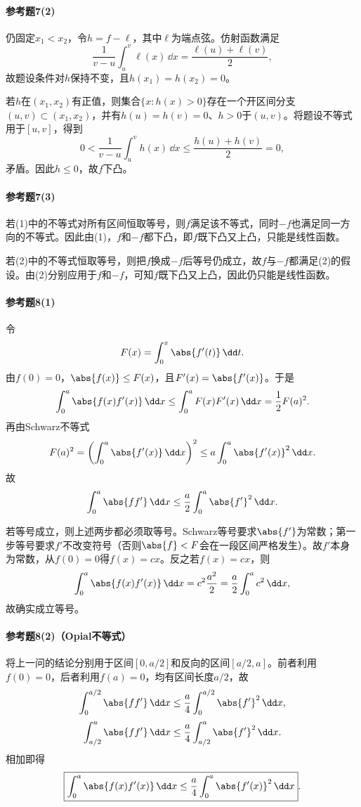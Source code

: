 \paragraph{参考题7(2)}
\begin{xsolution}
仍固定$x_1<x_2$，令$h=f-\ell$，其中$\ell$为端点弦。仿射函数满足
\[
 \frac1{v-u}\int_u^v\ell(x)\,\dd x=\frac{\ell(u)+\ell(v)}2,
\]
故题设条件对$h$保持不变，且$h(x_1)=h(x_2)=0$。

若$h$在$(x_1,x_2)$有正值，则集合$\{x:h(x)>0\}$存在一个开区间分支$(u,v)\subset(x_1,x_2)$，并有$h(u)=h(v)=0$、$h>0$于$(u,v)$。将题设不等式用于$[u,v]$，得到
\[
 0<\frac1{v-u}\int_u^vh(x)\,\dd x
 \le\frac{h(u)+h(v)}2=0,
\]
矛盾。因此$h\le0$，故$f$下凸。
\end{xsolution}

\paragraph{参考题7(3)}
\begin{xsolution}
若(1)中的不等式对所有区间恒取等号，则$f$满足该不等式，同时$-f$也满足同一方向的不等式。因此由(1)，$f$和$-f$都下凸，即$f$既下凸又上凸，只能是线性函数。

若(2)中的不等式恒取等号，则把$f$换成$-f$后等号仍成立，故$f$与$-f$都满足(2)的假设。由(2)分别应用于$f$和$-f$，可知$f$既下凸又上凸，因此仍只能是线性函数。
\end{xsolution}

\paragraph{参考题8(1)}
\begin{xsolution}
令
\[
 F(x)=\int_0^x\abs{f'(t)}\,\dd t.
\]
由$f(0)=0$，$\abs{f(x)}\le F(x)$，且$F'(x)=\abs{f'(x)}$。于是
\[
 \int_0^a\abs{f(x)f'(x)}\,\dd x
 \le\int_0^aF(x)F'(x)\,\dd x
 =\frac12F(a)^2.
\]
再由Schwarz不等式
\[
 F(a)^2=\left(\int_0^a\abs{f'(x)}\,\dd x\right)^2
 \le a\int_0^a\abs{f'(x)}^2\,\dd x.
\]
故
\[
 \int_0^a\abs{ff'}\,\dd x
 \le\frac a2\int_0^a\abs{f'}^2\,\dd x.
\]

若等号成立，则上述两步都必须取等号。Schwarz等号要求$\abs{f'}$为常数；第一步等号要求$f'$不改变符号（否则$\abs{f}<F$会在一段区间严格发生）。故$f'$本身为常数，从$f(0)=0$得$f(x)=cx$。反之若$f(x)=cx$，则
\[
 \int_0^a\abs{f(x)f'(x)}\,\dd x
 =c^2\frac{a^2}{2}
 =\frac a2\int_0^ac^2\,\dd x,
\]
故确实成立等号。
\end{xsolution}

\paragraph{参考题8(2)（Opial不等式）}
\begin{xsolution}
将上一问的结论分别用于区间$[0,a/2]$和反向的区间$[a/2,a]$。前者利用$f(0)=0$，后者利用$f(a)=0$，均有区间长度$a/2$，故
\[
 \int_0^{a/2}\abs{ff'}\,\dd x
 \le\frac a4\int_0^{a/2}\abs{f'}^2\,\dd x,
\]
\[
 \int_{a/2}^{a}\abs{ff'}\,\dd x
 \le\frac a4\int_{a/2}^{a}\abs{f'}^2\,\dd x.
\]
相加即得
\[
 \boxed{\int_0^a\abs{f(x)f'(x)}\,\dd x
 \le\frac a4\int_0^a\abs{f'(x)}^2\,\dd x}.
\]
\end{xsolution}


